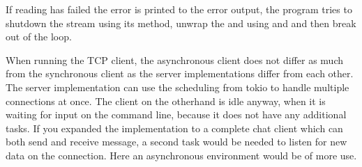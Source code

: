 If reading has failed the error is printed to the error output, the program tries to shutdown the stream using its
 method, unwrap the  and  using  and  and then break out
of the loop.

When running the TCP client, the asynchronous client does not differ as much from the synchronous client as the server
implementations differ from each other. The server implementation can use the scheduling from tokio to handle multiple
connections at once. The client on the otherhand is idle anyway, when it is waiting for input on the command line,
because it does not have any additional tasks. If you expanded the implementation to a complete chat client which can
both send and receive message, a second task would be needed to listen for new data on the connection. Here an
asynchronous environment would be of more use.

